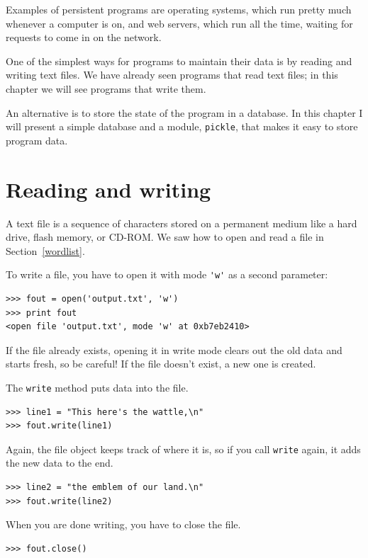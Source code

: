 \documentclass[10pt]{book}
\begin{document}
Examples of persistent programs are operating systems, which
run pretty much whenever a computer is on, and web servers,
which run all the time, waiting for requests to come in on
the network.

One of the simplest ways for programs to maintain their data
is by reading and writing text files.  We have already seen
programs that read text files; in this chapter we will see programs
that write them.

An alternative is to store the state of the program in a database.
In this chapter I will present a simple database and a module,
{\tt pickle}, that makes it easy to store program data.


\section{Reading and writing}

A text file is a sequence of characters stored on a permanent
medium like a hard drive, flash memory, or CD-ROM.  We saw how
to open and read a file in Section~\ref{wordlist}.

To write a file, you have to open it with mode \verb"'w'" as a second
parameter:

\begin{verbatim}
>>> fout = open('output.txt', 'w')
>>> print fout
<open file 'output.txt', mode 'w' at 0xb7eb2410>
\end{verbatim}
%
If the file already exists, opening it in write mode clears out
the old data and starts fresh, so be careful!
If the file doesn't exist, a new one is created.

The {\tt write} method puts data into the file.

\begin{verbatim}
>>> line1 = "This here's the wattle,\n"
>>> fout.write(line1)
\end{verbatim}
%
Again, the file object keeps track of where it is, so if
you call {\tt write} again, it adds the new data to the end.

\begin{verbatim}
>>> line2 = "the emblem of our land.\n"
>>> fout.write(line2)
\end{verbatim}
%
When you are done writing, you have to close the file.

\begin{verbatim}
>>> fout.close()
\end{verbatim}
%
\end{document}
